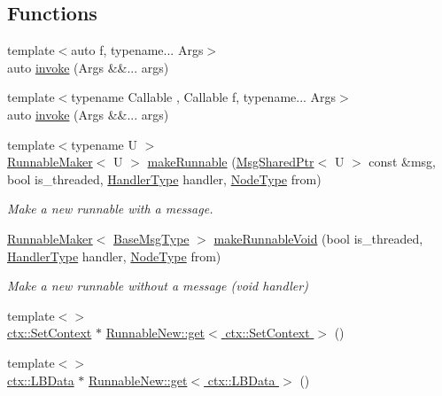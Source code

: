 \subsection*{Functions}
\begin{DoxyCompactItemize}
\item 
{\footnotesize template$<$auto f, typename... Args$>$ }\\auto \hyperlink{namespacevt_1_1runnable_a004d4b72c158a64f01404ac5dac24ec6}{invoke} (Args \&\&... args)
\item 
{\footnotesize template$<$typename Callable , Callable f, typename... Args$>$ }\\auto \hyperlink{namespacevt_1_1runnable_a767f5673027ff59a60d513209691f5ed}{invoke} (Args \&\&... args)
\item 
{\footnotesize template$<$typename U $>$ }\\\hyperlink{structvt_1_1runnable_1_1_runnable_maker}{Runnable\+Maker}$<$ U $>$ \hyperlink{namespacevt_1_1runnable_afb8d5dae85a94591271296e201b4f838}{make\+Runnable} (\hyperlink{namespacevt_ab2b3d506ec8e8d1540aede826d84a239}{Msg\+Shared\+Ptr}$<$ U $>$ const \&msg, bool is\+\_\+threaded, \hyperlink{namespacevt_af64846b57dfcaf104da3ef6967917573}{Handler\+Type} handler, \hyperlink{namespacevt_a866da9d0efc19c0a1ce79e9e492f47e2}{Node\+Type} from)
\begin{DoxyCompactList}\small\item\em Make a new runnable with a message. \end{DoxyCompactList}\item 
\hyperlink{structvt_1_1runnable_1_1_runnable_maker}{Runnable\+Maker}$<$ \hyperlink{namespacevt_a44d0d4e144748f2b19a1cfd962f50338}{Base\+Msg\+Type} $>$ \hyperlink{namespacevt_1_1runnable_aa35ee520f896c49ba7f3952acb5881b2}{make\+Runnable\+Void} (bool is\+\_\+threaded, \hyperlink{namespacevt_af64846b57dfcaf104da3ef6967917573}{Handler\+Type} handler, \hyperlink{namespacevt_a866da9d0efc19c0a1ce79e9e492f47e2}{Node\+Type} from)
\begin{DoxyCompactList}\small\item\em Make a new runnable without a message (void handler) \end{DoxyCompactList}\item 
{\footnotesize template$<$$>$ }\\\hyperlink{structvt_1_1ctx_1_1_set_context}{ctx\+::\+Set\+Context} $\ast$ \hyperlink{namespacevt_1_1runnable_afec92e402b96766d18a24246651015f3}{Runnable\+New\+::get$<$ ctx\+::\+Set\+Context $>$} ()
\item 
{\footnotesize template$<$$>$ }\\\hyperlink{structvt_1_1ctx_1_1_l_b_data}{ctx\+::\+L\+B\+Data} $\ast$ \hyperlink{namespacevt_1_1runnable_ace1b6a23d611fae4fa00910100d91702}{Runnable\+New\+::get$<$ ctx\+::\+L\+B\+Data $>$} ()
\end{DoxyCompactItemize}


